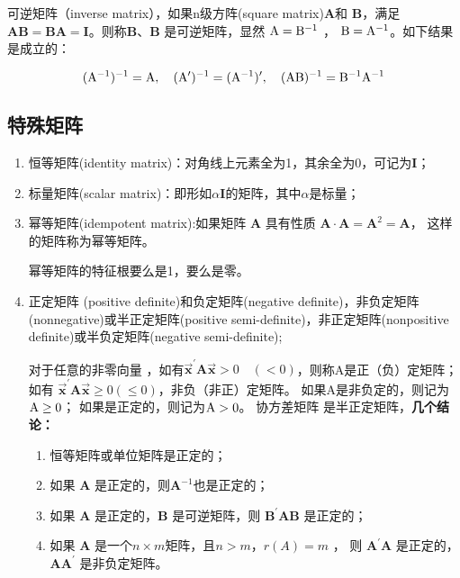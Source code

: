  可逆矩阵（inverse matrix），如果n级方阵(square matrix)$ {\boldsymbol{A}} $和 ${\boldsymbol{B}}$，满足$ \boldsymbol{AB}=\boldsymbol{BA}=
 \boldsymbol{I} $。则称$ \boldsymbol{B} $、$ \boldsymbol{B}$ 是可逆矩阵，显然
 $ \rm \boldsymbol{A} = {\boldsymbol{B}}^{-1} $ ，  $ \rm \boldsymbol{B} = {\boldsymbol{A}}^{-1} $。如下结果是成立的：

  $$  \rm (\boldsymbol{A}^{-1}) ^{-1} = \boldsymbol{A},  \quad 
	   (\boldsymbol{A}^{\prime}) ^{-1} = (\boldsymbol{A}^{-1}) ^{\prime} , \quad 
	    (\boldsymbol{AB})^{-1} = \boldsymbol{B}^{-1} \boldsymbol{A}^{-1} $$
   
\subsection{特殊矩阵}

\begin{enumerate}[ 1) ] 
	\item 恒等矩阵(identity matrix)：对角线上元素全为1，其余全为0，可记为$\boldsymbol{I}$；
	\item 标量矩阵(scalar matrix)：即形如$ \alpha \boldsymbol{I} $的矩阵，其中$ \alpha $是标量；
	\item 幂等矩阵(idempotent matrix):如果矩阵 $ \boldsymbol{A} $ 具有性质 $ \boldsymbol{A} \cdot  \boldsymbol{A} = {\boldsymbol{A}}^{2} = \boldsymbol{A} $，
			这样的矩阵称为幂等矩阵。
	
	\begin{theorem}
		幂等矩阵的特征根要么是1，要么是零。
	\end{theorem}
	
	\item 正定矩阵 (positive definite)和负定矩阵(negative definite)，非负定矩阵(nonnegative)或半正定矩阵(positive semi-definite)，非正定矩阵(nonpositive  definite)或半负定矩阵(negative semi-definite);
	
		对于任意的非零向量 ，如有$ \vec{ \boldsymbol{x} }^{\prime} \boldsymbol{A} \vec{\boldsymbol{x}}>0 \quad(<0)$，则称A是正（负）定矩阵；
		如有 $  \vec { \boldsymbol{x}}^{\prime} \boldsymbol{A}  \vec {\boldsymbol{x}} \ge  0(\leq 0) $，非负（非正）定矩阵。
		如果A是非负定的，则记为$ \rm \boldsymbol{A} \ge 0 $；
		如果是正定的，则记为$ \rm \boldsymbol{A} > 0 $。
		协方差矩阵 是半正定矩阵，{\bf 几个结论： }
		
	\begin{enumerate}[ a) ]
		\item 恒等矩阵或单位矩阵是正定的；
		\item 如果 $ \boldsymbol{A} $ 是正定的，则$ \boldsymbol{A} ^{-1} $也是正定的；
		\item 如果 $ \boldsymbol{A} $ 是正定的，$ \boldsymbol{B} $ 是可逆矩阵，则 $ \boldsymbol{B}^{\prime} \boldsymbol{A} \boldsymbol{B} $ 是正定的；
		\item 如果 $ \boldsymbol{A} $ 是一个$ n \times m $矩阵，且$ n > m $，$ r(A) = m $ ，
				则 $ \boldsymbol{A}^{\prime} \boldsymbol{A}  $ 是正定的，$  \boldsymbol{A} \boldsymbol{A}^{\prime}  $ 是非负定矩阵。
	\end{enumerate}


\end{enumerate}
